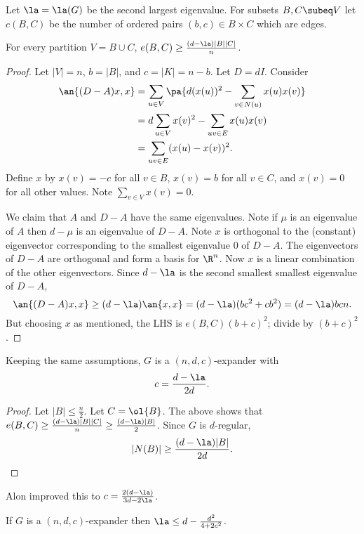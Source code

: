 Let $\la=\la(G)$ be the second largest eigenvalue. For subsets $B,C\subeq V$ let $c(B,C)$ be the number of ordered pairs $(b,c)\in B\times C$ which are edges.

\begin{thm}
For every partition $V=B\cup C$, $e(B,C)\ge \frac{(d-\la)|B||C|}{n}$.
\end{thm}
\begin{proof}
Let $|V|=n$, $b=|B|$, and $c=|K|=n-b$. Let $D=dI$. Consider
\begin{align*}
\an{(D-A)x,x}&=\sum_{u\in V} \pa{d(x(u))^2-\sum_{v\in N(u)} x(u)x(v)}\\
&=d\sum_{u\in V} x(v)^2-\sum_{uv\in E} x(u)x(v)\\
&=\sum_{uv\in E} (x(u)-x(v))^2.
\end{align*}
Define $x$ by $x(v)=-c$ for all $v\in B$, $x(v)=b$ for all $v\in C$, and $x(v)=0$ for all other values. Note $\sum_{v\in V}x(v)=0$.

We claim that $A$ and $D-A$ have the same eigenvalues. Note if $\mu$ is an eigenvalue of $A$ then $d-\mu$ is an eigenvalue of $D-A$. Note $x$ is orthogonal to the (constant) eigenvector corresponding to the smallest eigenvalue 0 of $D-A$. The eigenvectors of $D-A$ are orthogonal and form a basis for $\R^n$. Now $x$ is a linear combination of the other eigenvectors. Since $d-\la$ is the second smallest smallest eigenvalue of $D-A$, %
\[
\an{(D-A)x,x}\ge (d-\la)\an{x,x}=(d-\la)(bc^2+cb^2)=(d-\la)bcn.
\]
But choosing $x$ as mentioned, the LHS is $e(B,C)(b+c)^2$; divide by $(b+c)^2$. 
\end{proof}
\begin{cor}
Keeping the same assumptions, $G$ is a $(n,d,c)$-expander with
\[
c=\frac{d-\la}{2d}.
\]
\end{cor}
\begin{proof}
Let $|B|\le \frac n2$. Let $C=\ol{B}$. The above shows that $e(B,C)\ge\frac{(d-\la)|B||C|}{n}\ge \frac{(d-\la)|B|}{2}$.  Since $G$ is $d$-regular, 
\[
|N(B)|\ge \frac{(d-\la) |B|}{2d}.
\]
\end{proof}
Alon improved this to $c=\frac{2(d-\la)}{3d-2\la}$.
\begin{thm}
If $G$ is a $(n,d,c)$-expander then $\la\le d-\frac{d^2}{4+2c^2}$.
\end{thm}
